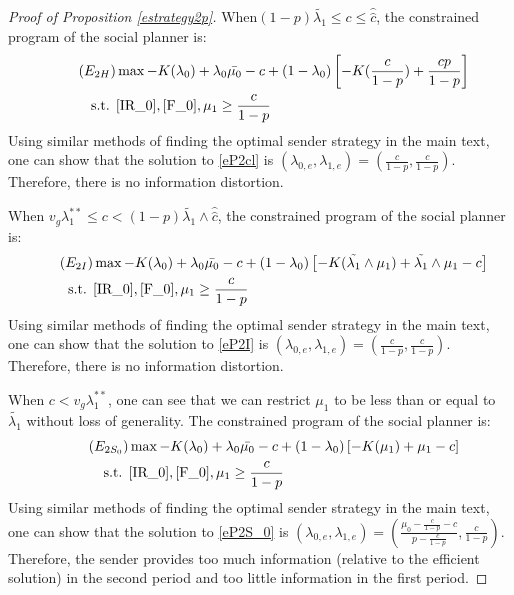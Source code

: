 \documentclass[11pt]{extarticle}
\newcommand{\m}{\wedge}
\begin{document}
\begin{proof}[Proof of Proposition \ref{estrategy2p}]
	
	When$(1-p)\tilde{\lambda_1} \leq c \leq \widehat{\widehat{c}}$, the constrained program of the social planner is:
	\begin{align}\tag{$E_{2H}$} \label{eP2cl}
	& \max -K(\lambda_0) + \lambda_0 \bar{\mu_0} - c + (1-\lambda_0) \left[-K(\frac{c}{1-p})+\frac{cp}{1-p}\right] \nonumber\\
	\text{s.t. } &\eqref{IR_0},\eqref{F_0},\mu_1 \geq \frac{c}{1-p} \nonumber
	\end{align}
	Using similar methods of finding the optimal sender strategy in the main text, one can show that the solution to \eqref{eP2cl} is $(\lambda_{0,e}, \lambda_{1,e}) = (\frac{c}{1-p}, \frac{c}{1-p})$. Therefore, there is no information distortion.  
	
	When $v_g\lambda_1^{**} \leq c < (1-p)\tilde{\lambda_1} \m \widehat{\widehat{c}}$, the constrained program of the social planner is:
	\begin{align}\tag{$E_{2I}$} \label{eP2I}
	& \max -K(\lambda_0) + \lambda_0 \bar{\mu_0} - c + (1-\lambda_0) \left[-K(\tilde{\lambda_1} \m \mu_1)+\tilde{\lambda_1} \m \mu_1-c\right] \nonumber\\
	\text{s.t. } &\eqref{IR_0},\eqref{F_0},\mu_1 \geq \frac{c}{1-p} \nonumber
	\end{align}
	Using similar methods of finding the optimal sender strategy in the main text, one can show that the solution to \eqref{eP2I} is $(\lambda_{0,e}, \lambda_{1,e}) = (\frac{c}{1-p}, \frac{c}{1-p})$. Therefore, there is no information distortion.
	
	When $c < v_g\lambda_1^{**}$, one can see that we can restrict $\mu_1$ to be less than or equal to $\tilde{\lambda_1}$ without loss of generality. The constrained program of the social planner is:
	\begin{align}\tag{$E_{2S_0}$} \label{eP2S_0}
	& \max -K(\lambda_0) + \lambda_0 \bar{\mu_0} - c + (1-\lambda_0) \left[-K(\mu_1)+\mu_1-c\right] \nonumber\\
	\text{s.t. } &\eqref{IR_0},\eqref{F_0},\mu_1 \geq \frac{c}{1-p} \nonumber
	\end{align}
	Using similar methods of finding the optimal sender strategy in the main text, one can show that the solution to \eqref{eP2S_0} is $(\lambda_{0,e}, \lambda_{1,e}) = (\frac{\mu_0-\frac{c}{1-p}-c}{p-\frac{c}{1-p}}, \frac{c}{1-p})$. Therefore, the sender provides too much information (relative to the efficient solution) in the second period and too little information in the first period.
\end{proof}
\end{document}
